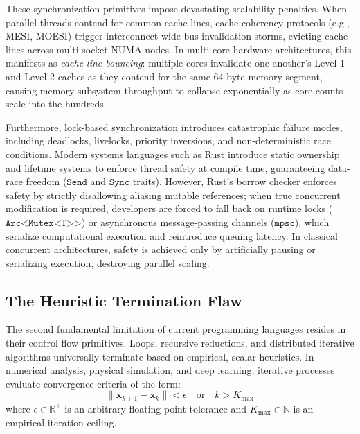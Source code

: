 These synchronization primitives impose devastating scalability penalties. When parallel threads contend for common cache lines, cache coherency protocols (e.g., MESI, MOESI) trigger interconnect-wide bus invalidation storms, evicting cache lines across multi-socket NUMA nodes. In multi-core hardware architectures, this manifests as \textit{cache-line bouncing}: multiple cores invalidate one another's Level 1 and Level 2 caches as they contend for the same 64-byte memory segment, causing memory subsystem throughput to collapse exponentially as core counts scale into the hundreds.

Furthermore, lock-based synchronization introduces catastrophic failure modes, including deadlocks, livelocks, priority inversions, and non-deterministic race conditions. Modern systems languages such as Rust \cite{matsakis2014rust} introduce static ownership and lifetime systems to enforce thread safety at compile time, guaranteeing data-race freedom ($\texttt{Send}$ and $\texttt{Sync}$ traits). However, Rust's borrow checker enforces safety by strictly disallowing aliasing mutable references; when true concurrent modification is required, developers are forced to fall back on runtime locks ($\texttt{Arc<Mutex<T>>}$) or asynchronous message-passing channels ($\texttt{mpsc}$), which serialize computational execution and reintroduce queuing latency. In classical concurrent architectures, safety is achieved only by artificially pausing or serializing execution, destroying parallel scaling.

\subsection{The Heuristic Termination Flaw}
The second fundamental limitation of current programming languages resides in their control flow primitives. Loops, recursive reductions, and distributed iterative algorithms universally terminate based on empirical, scalar heuristics. In numerical analysis, physical simulation, and deep learning, iterative processes evaluate convergence criteria of the form:
\begin{equation}
    \| \mathbf{x}_{k+1} - \mathbf{x}_k \| < \epsilon \quad \text{or} \quad k > K_{\max}
\end{equation}
where $\epsilon \in \mathbb{R}^+$ is an arbitrary floating-point tolerance and $K_{\max} \in \mathbb{N}$ is an empirical iteration ceiling.


